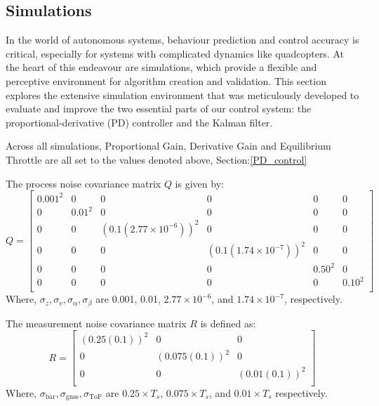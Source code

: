 \documentclass{report}
\begin{document}
\subsection{Simulations}\label{PD_simulations} In the world of autonomous
systems, behaviour prediction and control accuracy is critical, especially for
systems with complicated dynamics like quadcopters. At the heart of this
endeavour are simulations, which provide a flexible and perceptive environment
for algorithm creation and validation. This section explores the extensive
simulation environment that was meticulously developed to evaluate and improve
the two essential parts of our control system: the proportional-derivative (PD)
controller and the Kalman filter.

Across all simulations, Proportional Gain, Derivative Gain and Equilibrium
Throttle are all set to the values denoted above, Section:\ref{PD_control}

The process noise covariance matrix \( Q \) is given by:
\begin{equation}
Q = \begin{bmatrix}
0.001^2 & 0 & 0 & 0 & 0 & 0 \\
0 & 0.01^2 & 0 & 0 & 0 & 0 \\
0 & 0 & (0.1 (2.77 \times 10^{-6}))^2 & 0 & 0 & 0 \\
0 & 0 & 0 & (0.1 (1.74 \times 10^{-7}))^2 & 0 & 0 \\
0 & 0 & 0 & 0 & 0.50^2 & 0 \\
0 & 0 & 0 & 0 & 0 & 0.10^2 \\
\end{bmatrix}
\end{equation}
Where, \( \sigma_z, \sigma_v, \sigma_\alpha, \sigma_\beta \) are 0.001, 0.01, \(
2.77 \times 10^{-6} \), and \( 1.74 \times 10^{-7} \), respectively.
\bigskip

The measurement noise covariance matrix \( R \) is defined as:
\begin{equation}
R = \begin{bmatrix}
(0.25(0.1))^2 & 0 & 0 \\
0 & (0.075(0.1))^2 & 0 \\
0 & 0 & (0.01(0.1))^2 \\
\end{bmatrix}
\end{equation}
Where, \( \sigma_{\text{bar}}, \sigma_{\text{gnss}}, \sigma_{\text{ToF}} \) are
\( 0.25 \times T_s \), \( 0.075 \times T_s \), and \( 0.01 \times T_s \)
respectively.
\end{document}
